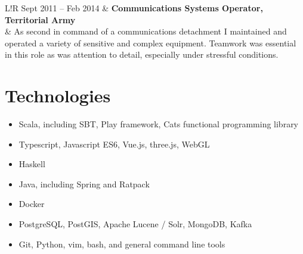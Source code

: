 \documentclass[10pt]{article}
\newcommand\VRule{\color{lightgray}\vrule width 0.5pt}
\begin{document}
\begin{tabular}{L!{\VRule}R}
    Sept 2011 -- Feb 2014 & \textbf{Communications Systems Operator, Territorial Army}\\
                        & As second in command of a communications detachment I
                        maintained and operated a variety of sensitive and complex
                        equipment. Teamwork was essential in this role as was attention
                        to detail, especially under stressful conditions. \\
\end{tabular}

\section*{Technologies}
\begin{multicols}{2}
\begin{itemize}
    \itemsep0em
    \item Scala, including SBT, Play framework, Cats functional programming library
    \item Typescript, Javascript ES6, Vue.js, three.js, WebGL
    \item Haskell
    \item Java, including Spring and Ratpack
    \item Docker
    \item PostgreSQL, PostGIS, Apache Lucene / Solr, MongoDB, Kafka
    \item Git, Python, vim, bash, and general command line tools
\end{itemize}
\end{multicols}
\end{document}
